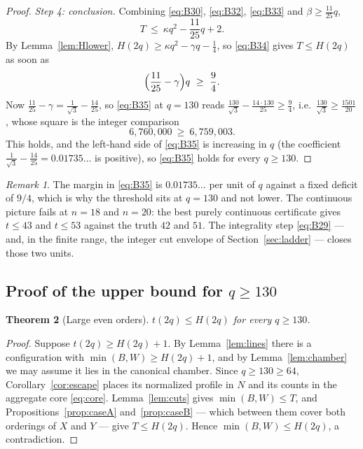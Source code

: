 \documentclass[11pt]{amsart}
\newtheorem{theorem}{Theorem}
\theoremstyle{definition}
\theoremstyle{remark}
\newtheorem{remark}[theorem]{Remark}
\begin{document}
\begin{proof}
\emph{Step 4: conclusion.} Combining \eqref{eq:B30}, \eqref{eq:B32}, \eqref{eq:B33} and $\beta\ge\frac{11}{25}q$,
\begin{equation}\label{eq:B34}
T\ \le\ \kappa q^2-\frac{11}{25}q+2 .
\end{equation}
By Lemma~\ref{lem:Hlower}, $H(2q)\ge\kappa q^2-\gamma q-\frac14$, so \eqref{eq:B34} gives $T\le H(2q)$ as soon as
\begin{equation}\label{eq:B35}
\Bigl(\frac{11}{25}-\gamma\Bigr)q\ \ge\ \frac94 .
\end{equation}
Now $\frac{11}{25}-\gamma=\frac1{\sqrt3}-\frac{14}{25}$, so \eqref{eq:B35} at $q=130$ reads $\frac{130}{\sqrt3}-\frac{14\cdot130}{25}\ge\frac94$, i.e.\ $\frac{130}{\sqrt3}\ge\frac{1501}{20}$, whose square is the integer comparison
\[
6{,}760{,}000\ \ge\ 6{,}759{,}003 .
\]
This holds, and the left-hand side of \eqref{eq:B35} is increasing in $q$ (the coefficient $\frac1{\sqrt3}-\frac{14}{25}=0.01735\ldots$ is positive), so \eqref{eq:B35} holds for every $q\ge130$.
\end{proof}

\begin{remark}\label{rem:integrality}
The margin in \eqref{eq:B35} is $0.01735\ldots$ per unit of $q$ against a fixed deficit of $9/4$, which is why the threshold sits at $q=130$ and not lower. The continuous picture fails at $n=18$ and $n=20$: the best purely continuous certificate gives $t\le43$ and $t\le53$ against the truth $42$ and $51$. The integrality step \eqref{eq:B29} --- and, in the finite range, the integer cut envelope of Section~\ref{sec:ladder} --- closes those two units.
\end{remark}

\subsection{Proof of the upper bound for \texorpdfstring{$q\ge130$}{q >= 130}}

\begin{theorem}[Large even orders]\label{thm:q130}
$t(2q)\le H(2q)$ for every $q\ge130$.
\end{theorem}

\begin{proof}
Suppose $t(2q)\ge H(2q)+1$. By Lemma~\ref{lem:lines} there is a configuration with $\min(B,W)\ge H(2q)+1$, and by Lemma~\ref{lem:chamber} we may assume it lies in the canonical chamber. Since $q\ge130\ge64$, Corollary~\ref{cor:escape} places its normalized profile in $N$ and its counts in the aggregate core \eqref{eq:core}. Lemma~\ref{lem:cuts} gives $\min(B,W)\le T$, and Propositions~\ref{prop:caseA} and~\ref{prop:caseB} --- which between them cover both orderings of $X$ and $Y$ --- give $T\le H(2q)$. Hence $\min(B,W)\le H(2q)$, a contradiction.
\end{proof}
\end{document}
